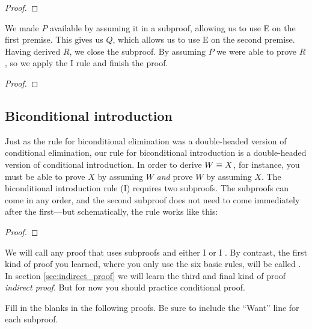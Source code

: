 \begin{proof}
	\open
	\close
\end{proof}

We made $P$ available by assuming it in a subproof, allowing us to use {\eif}E on the first premise. This gives us $Q$, which allows us to use {\eif}E on the second premise. Having derived  $R$, we close the subproof. By assuming $P$ we were able to prove $R$, so we apply the {\eif}I rule and finish the proof.

\label{HSproof}
\begin{proof}
	\open
	\close
\end{proof}


\subsection{Biconditional introduction}

Just as the rule for biconditional elimination was a double-headed version of conditional elimination, our rule for biconditional introduction is a double-headed version of conditional introduction. In order to derive $W \equiv X$, for instance, you must be able to prove $X$ by assuming $W$ \emph{and} prove $W$ by assuming $X$. The biconditional introduction rule ({\eiff}I) requires two subproofs. The subproofs can come in any order, and the second subproof does not need to come immediately after the first---but schematically, the rule works like this:

\begin{proof}
	\open
		 
	\close
	\open
		 
	\close
\end{proof}

We will call any proof that uses subproofs and either \eif I or \eiff I . By contrast, the first kind of proof you learned, where you only use the six basic 
rules, will be called . In section \ref{sec:indirect_proof} we will learn the third and final kind of proof \emph{indirect proof}. But for now you should practice 
conditional proof.

\practiceproblems
\noindent\problempart Fill in the blanks in the following proofs. Be sure to include the ``Want'' line for each subproof.  %

